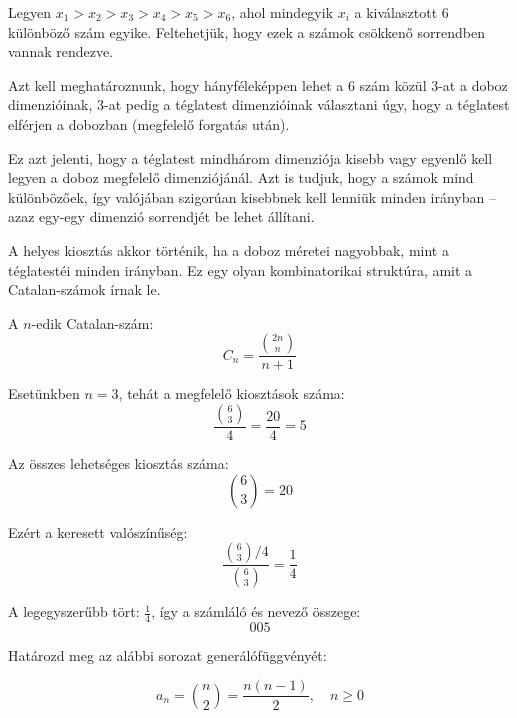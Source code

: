 \begin{solution}
Legyen $x_{1}>x_{2}>x_{3}>x_{4}>x_{5}>x_{6}$, ahol mindegyik $x_{i}$
a kiválasztott 6 különböző szám egyike. Feltehetjük, hogy ezek a számok
csökkenő sorrendben vannak rendezve.

Azt kell meghatároznunk, hogy hányféleképpen lehet a 6 szám közül
3-at a doboz dimenzióinak, 3-at pedig a téglatest dimenzióinak választani
úgy, hogy a téglatest elférjen a dobozban (megfelelő forgatás után).

Ez azt jelenti, hogy a téglatest mindhárom dimenziója kisebb vagy
egyenlő kell legyen a doboz megfelelő dimenziójánál. Azt is tudjuk,
hogy a számok mind különbözőek, így valójában szigorúan kisebbnek
kell lenniük minden irányban -- azaz egy-egy dimenzió sorrendjét
be lehet állítani.

A helyes kiosztás akkor történik, ha a doboz méretei nagyobbak, mint
a téglatestéi minden irányban. Ez egy olyan kombinatorikai struktúra,
amit a Catalan-számok írnak le.

A $n$-edik Catalan-szám: 
\[
C_{n}=\frac{\binom{2n}{n}}{n+1}
\]

Esetünkben $n=3$, tehát a megfelelő kiosztások száma: 
\[
\frac{\binom{6}{3}}{4}=\frac{20}{4}=5
\]

Az összes lehetséges kiosztás száma: 
\[
\binom{6}{3}=20
\]

Ezért a keresett valószínűség: 
\[
\frac{\binom{6}{3}/4}{\binom{6}{3}}=\frac{1}{4}
\]

A legegyszerűbb tört: $\frac{1}{4}$, így a számláló és nevező összege:
\[
\boxed{005}
\]
\end{solution}
\begin{extraproblem}
Határozd meg az alábbi sorozat generálófüggvényét:
\end{extraproblem}

\[
a_{n}=\binom{n}{2}=\frac{n(n-1)}{2},\quad n\geq0
\]

